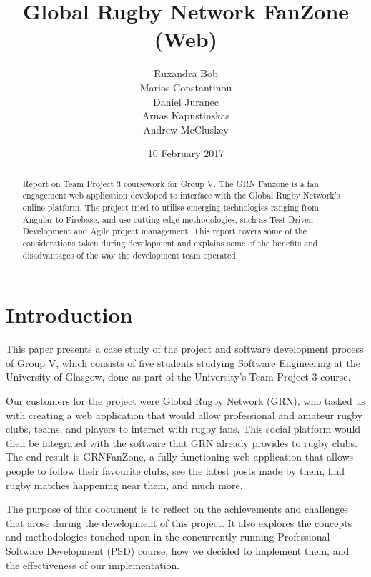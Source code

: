 \documentclass{l3proj}
\begin{document}
\title{Global Rugby Network FanZone (Web)}
\author{Ruxandra Bob \\
		Marios Constantinou \\
        Daniel Juranec \\
        Arnas Kapustinskas \\
        Andrew McCluskey}
\date{10 February 2017}
\maketitle
\begin{abstract}
Report on Team Project 3 coursework for Group V. The GRN Fanzone is a
 fan engagement web application developed to interface with the Global Rugby
 Network's online platform. The project tried to utilise
 emerging technologies ranging from Angular to Firebase, and use
 cutting-edge methodologies, such as Test Driven Development and Agile
 project management. This report covers some of the considerations taken
 during development and explains some of the benefits and disadvantages
 of the way the development team operated.
\end{abstract}
\educationalconsent
\newpage
\section{Introduction}


This paper presents a case study of the project and software development process of Group V, which consists of five students studying Software Engineering at the University of Glasgow, done as part of the University's Team Project 3 course.

Our customers for the project were Global Rugby Network (GRN), who tasked us with creating a web application that would allow professional and amateur rugby clubs, teams, and players to interact with rugby fans. This social platform would then be integrated with the software that GRN already provides to rugby clubs. The end result is GRNFanZone, a fully functioning web application that allows people to follow their favourite clubs, see the latest posts made by them, find rugby matches happening near them, and much more.

The purpose of this document is to reflect on the achievements and challenges that arose during the development of this project. It also explores the concepts and methodologies touched upon in the concurrently running Professional Software Development (PSD) course, how we decided to implement them, and the effectiveness of our implementation.
\end{document}
